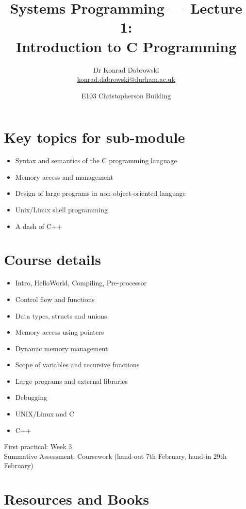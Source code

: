 \documentclass{article}
\title{Systems Programming --- Lecture 1:\\
Introduction to C Programming}
\author{Dr Konrad Dabrowski\\
\href{mailto://konrad.dabrowski@durham.ac.uk}{konrad.dabrowski@durham.ac.uk}
}
\date{E103 Christopherson Building}
\begin{document}
\maketitle




\section{Key topics for sub-module}
\begin{itemize}
\item Syntax and semantics of the C programming language
\item Memory access and management
\item Design of large programs in non-object-oriented language
\item Unix/Linux shell programming
\item A dash of C++
\end{itemize}



\section{Course details}
\begin{itemize}
\item Intro, HelloWorld, Compiling, Pre-processor
\item Control flow and functions
\item Data types, structs and unions
\item Memory access using pointers
\item Dynamic memory management
\item Scope of variables and recursive functions
\item Large programs and external libraries
\item Debugging
\item UNIX/Linux and C
\item C++
\end{itemize}

First practical: Week 3\\
Summative Assessment: Coursework (hand-out 7th February, hand-in 29th February)



\section{Resources and Books}
\end{document}
